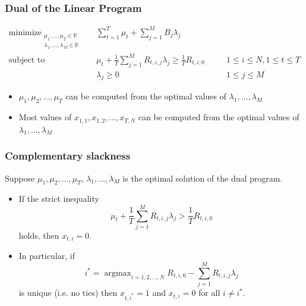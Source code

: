\documentclass[usenames,dvipsnames]{beamer}
\DeclareMathOperator*{\argmax}{argmax}
\DeclareMathOperator*{\minimize}{minimize}
\DeclareMathOperator*{\subjectto}{subject\ to}
\newcommand{\R}{\mathbb{R}}
\begin{document}
\begin{frame}
\frametitle{Dual of the Linear Program}

\begin{align*}
\minimize_{\substack{\mu_1, \dots, \mu_T \in \R \\ \lambda_1, \dots, \lambda_M \in \R}} \quad & \sum_{t=1}^T \mu_t + \sum_{j=1}^M B_j \lambda_j \\
\subjectto \quad & \mu_t + \frac{1}{T} \sum_{j=1}^M R_{t,i,j} \lambda_j  \ge \frac{1}{T} R_{t,i,0} && \quad 1 \le i \le N, 1 \le t \le T \\
& \lambda_j \ge 0 && \quad 1 \le j \le M
\end{align*}

\begin{itemize}
\item $\mu_1, \mu_2, \dots, \mu_T$ can be computed from the optimal values of $\lambda_1, \dots, \lambda_M$
\item Most values of $x_{1,1}, x_{1,2}, \dots, x_{T,N}$ can be computed from the optimal values of $\lambda_1, \dots, \lambda_M$
\end{itemize}

\end{frame}

\begin{frame}
\frametitle{Complementary slackness}

\begin{lemma}
Suppose $\mu_1, \mu_2, \dots, \mu_T$, $\lambda_1, \dots, \lambda_M$ is the optimal solution of the dual program.
\begin{itemize}
\item If the strict inequality
$$
\mu_t + \frac{1}{T} \sum_{j=1}^M R_{t,i,j} \lambda_j  > \frac{1}{T} R_{t,i,0}
$$
holds, then $x_{t,i} = 0$.

\item In particular, if
$$
i^* = \argmax_{i=1,2,\dots,N} R_{t,i,0} - \sum_{j=1}^M R_{t,i,j} \lambda_j
$$
is unique (i.e. no ties) then $x_{t,i^*} = 1$ and $x_{t,i} = 0$ for all $i \neq i^*$.
\end{itemize}
\end{lemma}

\end{frame}
\end{document}
